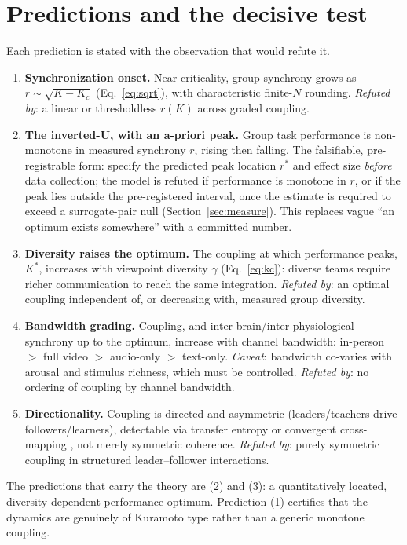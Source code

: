 \documentclass[11pt]{article}
\begin{document}
\section{Predictions and the decisive test}

Each prediction is stated with the observation that would refute it.

\begin{enumerate}
  \item \textbf{Synchronization onset.} Near criticality, group synchrony grows as $r \sim \sqrt{K-K_c}$ (Eq.~\ref{eq:sqrt}), with characteristic finite-$N$ rounding. \emph{Refuted by}: a linear or thresholdless $r(K)$ across graded coupling.
  \item \textbf{The inverted-U, with an a-priori peak.} Group task performance is non-monotone in measured synchrony $r$, rising then falling. The falsifiable, pre-registrable form: specify the predicted peak location $r^\ast$ and effect size \emph{before} data collection; the model is refuted if performance is monotone in $r$, or if the peak lies outside the pre-registered interval, once the estimate is required to exceed a surrogate-pair null (Section~\ref{sec:measure}). This replaces vague ``an optimum exists somewhere'' with a committed number.
  \item \textbf{Diversity raises the optimum.} The coupling at which performance peaks, $K^\ast$, increases with viewpoint diversity $\gamma$ (Eq.~\ref{eq:kc}): diverse teams require richer communication to reach the same integration. \emph{Refuted by}: an optimal coupling independent of, or decreasing with, measured group diversity.
  \item \textbf{Bandwidth grading.} Coupling, and inter-brain/inter-physiological synchrony up to the optimum, increase with channel bandwidth: in-person $>$ full video $>$ audio-only $>$ text-only. \emph{Caveat}: bandwidth co-varies with arousal and stimulus richness, which must be controlled. \emph{Refuted by}: no ordering of coupling by channel bandwidth.
  \item \textbf{Directionality.} Coupling is directed and asymmetric (leaders/teachers drive followers/learners), detectable via transfer entropy \citep{schreiber2000measuring} or convergent cross-mapping \citep{sugihara2012detecting}, not merely symmetric coherence. \emph{Refuted by}: purely symmetric coupling in structured leader--follower interactions.
\end{enumerate}

The predictions that carry the theory are (2) and (3): a quantitatively located, diversity-dependent performance optimum. Prediction (1) certifies that the dynamics are genuinely of Kuramoto type rather than a generic monotone coupling.
\end{document}
